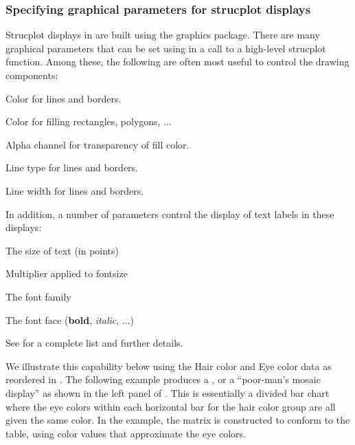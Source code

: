 \documentclass[11pt]{book}
\begin{document}
\subsubsection{Specifying graphical parameters for strucplot displays}
Strucplot displays in  are built using the  graphics package.
There are many graphical parameters that can be set using 
in a call to a high-level strucplot function.  Among these, the following are
often most useful to control the drawing components:
\begin{proglist}
  \item[\code{col}]   Color for lines and borders.
  \item[\code{fill}] 	Color for filling rectangles, polygons, ...
  \item[\code{alpha}] 	Alpha channel for transparency of fill color.
  \item[\code{lty}] 	Line type for lines and borders.
  \item[\code{lwd}] 	Line width for lines and borders.
\end{proglist}
In addition, a number of parameters control the display of text labels in these displays:
\begin{proglist}
  \item[\code{fontsize}]   The size of text (in points)
  \item[\code{cex}] 	Multiplier applied to fontsize
  \item[\code{fontfamily}] 	The font family
  \item[\code{fontface}] 	The font face (\textbf{bold}, \textit{italic}, ...)
\end{proglist}
See  for a complete list and further details.

We illustrate this capability below using the Hair color and Eye color data
as reordered in .  The following example produces
a , or a ``poor-man's mosaic display''
as shown in the left panel of .
This is 
essentially a divided bar chart where the eye colors
within each horizontal bar for the hair color group are all given the same
color.  In the example,
the matrix  is constructed to conform to the
 table, using color values that approximate the eye colors.
\end{document}
